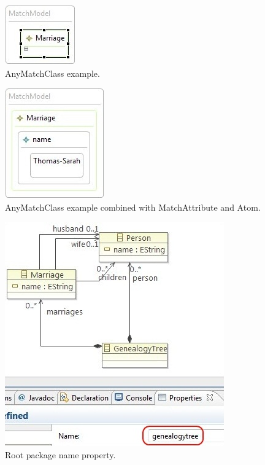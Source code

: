 \begin{figure}[h]
\begin{center}
  \includegraphics[scale=0.7]{imgs/any_match_class_example.jpg}
  \caption{AnyMatchClass example.}
  \label{fig:any_match_class_example}
\end{center}
\end{figure}


\begin{figure}[h]
\begin{center}
  \includegraphics[scale=0.7]{imgs/any_match_class_example_attr.jpg}
  \caption{AnyMatchClass example combined with MatchAttribute and Atom.}
  \label{fig:any_match_class_example_attr}
\end{center}
\end{figure}

\begin{figure}[h]
\begin{center}
  \includegraphics[scale=0.7]{imgs/ecore_root_package.jpg}
  \caption{Root package name property.}
  \label{fig:ecore_root_package}
\end{center}
\end{figure}



